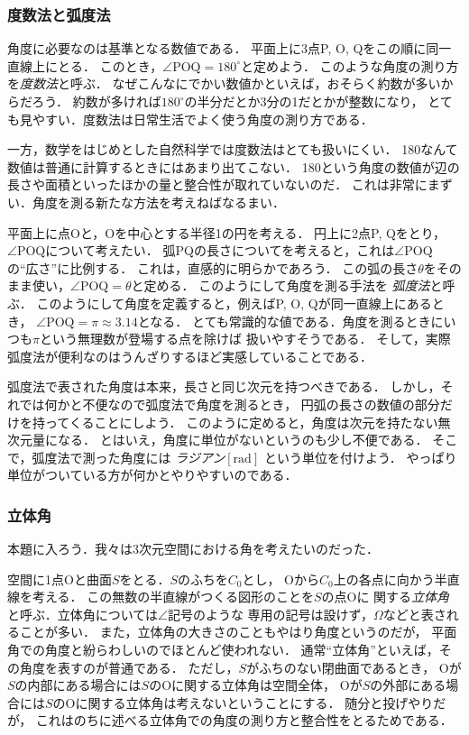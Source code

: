 \subsubsection{度数法と弧度法}
角度に必要なのは基準となる数値である．
平面上に3点P, O, Qをこの順に同一直線上にとる．
このとき，$\angle \mathrm{POQ} = 180^{\circ}$と定めよう．
このような角度の測り方を\emph{度数法}と呼ぶ．
なぜこんなにでかい数値かといえば，おそらく約数が多いからだろう．
約数が多ければ$180^{\circ}$の半分だとか3分の1だとかが整数になり，
とても見やすい．度数法は日常生活でよく使う角度の測り方である．

一方，数学をはじめとした自然科学では度数法はとても扱いにくい．
180なんて数値は普通に計算するときにはあまり出てこない．
180という角度の数値が辺の長さや面積といったほかの量と整合性が取れていないのだ．
これは非常にまずい．角度を測る新たな方法を考えねばなるまい．

平面上に点Oと，Oを中心とする半径1の円を考える．
円上に2点P, Qをとり，$\angle \mathrm{POQ}$について考えたい．
弧PQの長さについてを考えると，これは$\angle \mathrm{POQ}$の``広さ''に比例する．
これは，直感的に明らかであろう．
この弧の長さ$\theta$をそのまま使い，$\angle \mathrm{POQ} = \theta$と定める．
このようにして角度を測る手法を
\emph{弧度法}と呼ぶ．
このようにして角度を定義すると，例えばP, O, Qが同一直線上にあるとき，
$\angle \mathrm{POQ} = \pi \approx 3.14$となる．
とても常識的な値である．角度を測るときにいつも$\pi$という無理数が登場する点を除けば
扱いやすそうである．
そして，実際弧度法が便利なのはうんざりするほど実感していることである．

弧度法で表された角度は本来，長さと同じ次元を持つべきである．
しかし，それでは何かと不便なので弧度法で角度を測るとき，
円弧の長さの数値の部分だけを持ってくることにしよう．
このように定めると，角度は次元を持たない無次元量になる．
とはいえ，角度に単位がないというのも少し不便である．
そこで，弧度法で測った角度には
\emph{ラジアン}$[\mathrm{rad}]$
という単位を付けよう．
やっぱり単位がついている方が何かとやりやすいのである．

\subsubsection{立体角}
本題に入ろう．我々は3次元空間における角を考えたいのだった．

空間に1点Oと曲面$S$をとる．$S$のふちを$C_0$とし，
Oから$C_0$上の各点に向かう半直線を考える．
この無数の半直線がつくる図形のことを$S$の点Oに
関する\emph{立体角}
と呼ぶ．立体角については$\angle$記号のような
専用の記号は設けず，$\Omega$などと表されることが多い．
また，立体角の大きさのこともやはり角度というのだが，
平面角での角度と紛らわしいのでほとんど使われない．
通常``立体角''といえば，その角度を表すのが普通である．
ただし，$S$がふちのない閉曲面であるとき，
Oが$S$の内部にある場合には$S$のOに関する立体角は空間全体，
Oが$S$の外部にある場合には$S$のOに関する立体角は考えないということにする．
随分と投げやりだが，
これはのちに述べる立体角での角度の測り方と整合性をとるためである．

